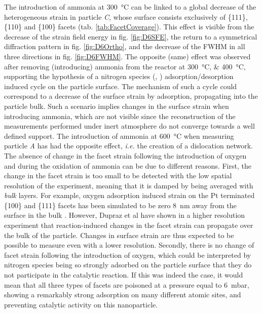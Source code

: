 The introduction of ammonia at \qty{300}{\degreeCelsius} can be linked to a global decrease of the heterogeneous strain in particle \textit{C}, whose surface consists exclusively of \{111\}, \{110\} and \{100\} facets (tab. \ref{tab:FacetCoverage}).
This effect is visible from the decrease of the strain field energy in fig. \ref{fig:D6SFE}, the return to a symmetrical diffraction pattern in fig. \ref{fig:D6Ortho}, and the decrease of the FWHM in all three directions in fig. \ref{fig:D6FWHM}.
The opposite (same) effect was observed after removing (introducing) ammonia from the reactor at \qtylist{300;400}{\degreeCelsius}, supporting the hypothesis of a nitrogen species (, ) adsorption/desorption induced cycle on the particle surface.
The mechanism of such a cycle could correspond to a decrease of the surface strain by adsorption, propagating into the particle bulk.
Such a scenario implies changes in the surface strain when introducing ammonia, which are not visible since the reconstruction of the measurements performed under inert atmosphere do not converge towards a well defined support.
The introduction of ammonia at \qty{600}{\degreeCelsius} when measuring particle \textit{A} has had the opposite effect, \textit{i.e.} the creation of a dislocation network.
The absence of change in the facet strain following the introduction of oxygen and during the oxidation of ammonia can be due to different reasons.
First, the change in the facet strain is too small to be detected with the low spatial resolution of the experiment, meaning that it is damped by being averaged with \textit{bulk} layers.
For example, oxygen adsorption induced strain on the Pt terminated \{100\} and \{111\} facets has been simulated to be zero \qty{8}{\nm} away from the surface in the bulk \parencite{Kim2021}.
However, Dupraz et al \parencite*{Dupraz2022} have shown in a higher resolution experiment that reaction-induced changes in the facet strain can propagate over the bulk of the particle.
Changes in surface strain are thus expected to be possible to measure even with a lower resolution.
Secondly, there is no change of facet strain following the introduction of oxygen, which could be interpreted by nitrogen species being so strongly adsorbed on the particle surface that they do not participate in the catalytic reaction.
If this was indeed the case, it would mean that all three types of facets are poisoned at a  pressure equal to \qty{6}{\milli\bar}, showing a remarkably strong adsorption on many different atomic sites, and preventing catalytic activity on this nanoparticle.
